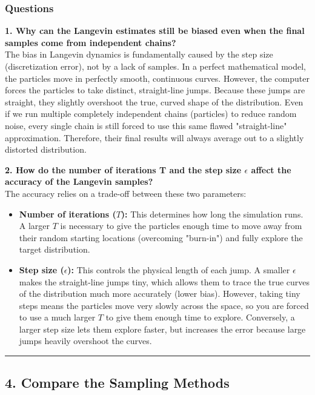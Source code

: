 \documentclass[a4paper,12pt]{extarticle}
\begin{document}
\subsubsection*{Questions}

\textbf{1. Why can the Langevin estimates still be biased even when the final samples come from independent chains?} \\
The bias in Langevin dynamics is fundamentally caused by the step size (discretization error), not by a lack of samples. In a perfect mathematical model, the particles move in perfectly smooth, continuous curves. However, the computer forces the particles to take distinct, straight-line jumps. Because these jumps are straight, they slightly overshoot the true, curved shape of the distribution. Even if we run multiple completely independent chains (particles) to reduce random noise, every single chain is still forced to use this same flawed "straight-line" approximation. Therefore, their final results will always average out to a slightly distorted distribution.

\vspace{0.3cm}
\textbf{2. How do the number of iterations T and the step size $\epsilon$ affect the accuracy of the Langevin samples?} \\
The accuracy relies on a trade-off between these two parameters:
\begin{itemize}
    \item \textbf{Number of iterations ($T$):} This determines how long the simulation runs. A larger $T$ is necessary to give the particles enough time to move away from their random starting locations (overcoming "burn-in") and fully explore the target distribution.
    \item \textbf{Step size ($\epsilon$):} This controls the physical length of each jump. A smaller $\epsilon$ makes the straight-line jumps tiny, which allows them to trace the true curves of the distribution much more accurately (lower bias). However, taking tiny steps means the particles move very slowly across the space, so you are forced to use a much larger $T$ to give them enough time to explore. Conversely, a larger step size lets them explore faster, but increases the error because large jumps heavily overshoot the curves.
\end{itemize}

\vspace{0.5cm}
\hrule
\vspace{0.5cm}

\subsection{4. Compare the Sampling Methods}
\end{document}
